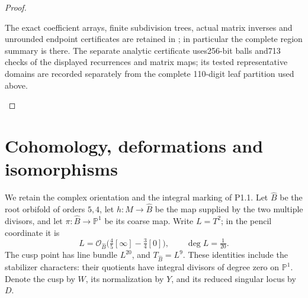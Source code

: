 \documentclass[11pt,a4paper]{article}
\theoremstyle{definition}
\begin{document}
\begin{proof}
\begin{enumerate}[label=\arabic*.]
The exact coefficient arrays, finite subdivision trees, actual
matrix inverses and unrounded endpoint certificates are retained
in ; in particular the complete
region summary is
 there.
The separate analytic certificate uses256-bit balls and713
checks of the displayed recurrences and matrix maps; its tested
representative domains are recorded separately from the complete
110-digit leaf partition used above.
\end{enumerate}
\end{proof}


\section{Cohomology, deformations and isomorphisms}

We retain the complex orientation and the integral marking of P1.1.
Let $\widehat B$ be the root orbifold of orders $5,4$, let
$h:M\to\widehat B$ be the map supplied by the two multiple divisors,
and let $\pi:\widehat B\to\mathbb P^1$ be its coarse map.
Write $L=T^2$; in the pencil coordinate it is
\[
 L=\mathcal O_{\widehat B}\bigl(\tfrac45[\infty]
                  -\tfrac34[0]\bigr),\qquad \deg L=\tfrac1{20}.
\]
The cusp point has line bundle $L^{20}$, and
$T_{\widehat B}=L^9$. These identities include the stabilizer
characters: their quotients have integral divisors of degree zero
on $\mathbb P^1$. Denote the cusp by $W$, its normalization by $Y$,
and its reduced singular locus by $D$.
\end{document}
